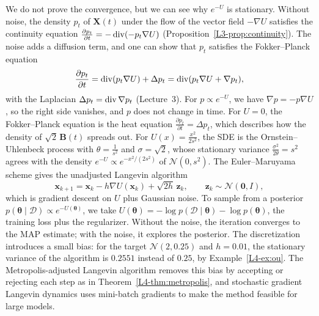 We do not prove the convergence, but we can see why $e^{-U}$ is stationary. Without noise, the density $p_t$ of $\mathbf{X}(t)$ under the flow of the vector field $-\nabla U$ satisfies the continuity equation $\frac{\partial p_t}{\partial t} = -\operatorname{div}(-p_t\nabla U)$ (Proposition~\ref{L3-prop:continuity}). The noise adds a diffusion term, and one can show that $p_t$ satisfies the Fokker--Planck equation
\[\frac{\partial p_t}{\partial t} = \operatorname{div}(p_t\nabla U) + \Delta p_t = \operatorname{div}(p_t\nabla U + \nabla p_t),\]
with the Laplacian $\Delta p_t = \operatorname{div}\nabla p_t$ (Lecture~3). For $p \propto e^{-U}$, we have $\nabla p = -p\nabla U$, so the right side vanishes, and $p$ does not change in time. For $U = 0$, the Fokker--Planck equation is the heat equation $\frac{\partial p_t}{\partial t} = \Delta p_t$, which describes how the density of $\sqrt{2}\,\mathbf{B}(t)$ spreads out. For $U(x) = \frac{x^2}{2s^2}$, the SDE is the Ornstein--Uhlenbeck process with $\theta = \frac{1}{s^2}$ and $\sigma = \sqrt{2}$, whose stationary variance $\frac{\sigma^2}{2\theta} = s^2$ agrees with the density $e^{-U} \propto e^{-x^2/(2s^2)}$ of $\mathcal{N}(0, s^2)$. The Euler--Maruyama scheme gives the unadjusted Langevin algorithm
\[\mathbf{x}_{k+1} = \mathbf{x}_k - h\nabla U(\mathbf{x}_k) + \sqrt{2h}\,\mathbf{z}_k, \qquad \mathbf{z}_k \sim \mathcal{N}(\mathbf{0}, I),\]
which is gradient descent on $U$ plus Gaussian noise. To sample from a posterior $p(\boldsymbol{\theta} \mid \mathcal{D}) \propto e^{-U(\boldsymbol{\theta})}$, we take $U(\boldsymbol{\theta}) = -\log p(\mathcal{D} \mid \boldsymbol{\theta}) - \log p(\boldsymbol{\theta})$, the training loss plus the regularizer. Without the noise, the iteration converges to the MAP estimate; with the noise, it explores the posterior. The discretization introduces a small bias: for the target $\mathcal{N}(2, 0.25)$ and $h = 0.01$, the stationary variance of the algorithm is $0.2551$ instead of $0.25$, by Example~\ref{L4-ex:ou}. The Metropolis-adjusted Langevin algorithm removes this bias by accepting or rejecting each step as in Theorem~\ref{L4-thm:metropolis}, and stochastic gradient Langevin dynamics uses mini-batch gradients to make the method feasible for large models.

